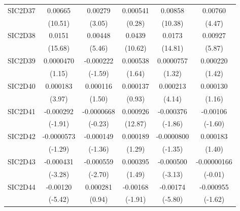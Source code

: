 \begin{table}[htbp]
\begin{tabular}{l*{5}{c}}
SIC2D37     &     0.00665\sym{***}&     0.00279\sym{**} &    0.000541         &     0.00858\sym{***}&     0.00760\sym{***}\\
            &     (10.51)         &      (3.05)         &      (0.28)         &     (10.38)         &      (4.47)         \\
SIC2D38     &      0.0151\sym{***}&     0.00448\sym{***}&      0.0439\sym{***}&      0.0173\sym{***}&     0.00927\sym{***}\\
            &     (15.68)         &      (5.46)         &     (10.62)         &     (14.81)         &      (5.87)         \\
SIC2D39     &   0.0000470         &   -0.000222         &    0.000538         &   0.0000757         &    0.000220         \\
            &      (1.15)         &     (-1.59)         &      (1.64)         &      (1.32)         &      (1.42)         \\
SIC2D40     &    0.000183\sym{***}&    0.000116         &    0.000137         &    0.000213\sym{***}&    0.000130         \\
            &      (3.97)         &      (1.50)         &      (0.93)         &      (4.14)         &      (1.16)         \\
SIC2D41     &   -0.000292         &  -0.0000668         &    0.000926\sym{***}&   -0.000376         &    -0.00106         \\
            &     (-1.91)         &     (-0.23)         &     (12.87)         &     (-1.86)         &     (-1.60)         \\
SIC2D42     &  -0.0000573         &   -0.000149         &    0.000189         &  -0.0000800         &    0.000183         \\
            &     (-1.29)         &     (-1.36)         &      (1.29)         &     (-1.35)         &      (1.40)         \\
SIC2D43     &   -0.000431\sym{**} &   -0.000559\sym{**} &    0.000395         &   -0.000500\sym{**} & -0.00000166         \\
            &     (-3.28)         &     (-2.70)         &      (1.49)         &     (-3.13)         &     (-0.01)         \\
SIC2D44     &    -0.00120\sym{***}&    0.000281         &    -0.00168         &    -0.00174\sym{***}&   -0.000955         \\
            &     (-5.42)         &      (0.94)         &     (-1.91)         &     (-5.80)         &     (-1.62)         \\

\end{tabular}
\end{table}
